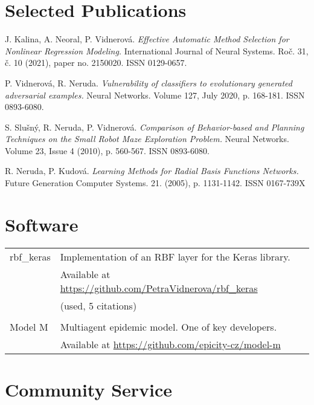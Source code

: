 \documentclass[a4paper, oneside, final]{scrartcl} %
\begin{document}
 \section{Selected Publications}
 \noindent
J. Kalina, A. Neoral, P. Vidnerová.
{\em Effective Automatic Method Selection for Nonlinear Regression Modeling.}
International Journal of Neural Systems. Roč. 31, č. 10 (2021), paper no. 2150020. ISSN 0129-0657.

\noindent
P. Vidnerov\'a, R. Neruda.  {\em Vulnerability of classifiers to evolutionary
  generated adversarial examples.}  Neural Networks. Volume 127, July 2020,
p. 168-181. ISSN 0893-6080.

\noindent
S. Slu\v{s}n\'y, R. Neruda, P. Vidnerov\'a.  {\em Comparison of
  Behavior-based and Planning Techniques on the Small Robot Maze
  Exploration Problem.}  Neural Networks. Volume 23, Issue 4 (2010),
p. 560-567. ISSN 0893-6080.

\noindent
R. Neruda, P. Kudov\'a.  {\em Learning Methods for Radial Basis
  Functions Networks.}  Future Generation Computer
Systems. 21. (2005), p. 1131-1142. ISSN 0167-739X

\section{Software}
\begin{tabularx}{0.97\linewidth}{>{\raggedleft}p{2cm}X}
  rbf\_keras & Implementation of an RBF layer for the Keras library. \\
   & Available at
  \href{https://github.com/PetraVidnerova/rbf_keras}{https://github.com/PetraVidnerova/rbf\_keras}\\
  & (used, 5 citations)\\
  \\
  Model M & Multiagent epidemic model. One of key developers. \\
  & Available at
  \href{https://github.com/epicity-cz/model-m}{https://github.com/epicity-cz/model-m} \\
\end{tabularx}


\section{Community Service}
\end{document}
